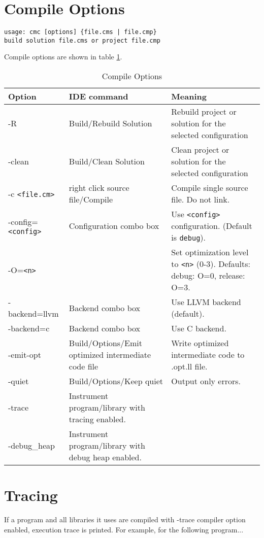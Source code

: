\documentclass[oneside, a4paper, 11pt]{article}
\begin{document}
\section{Compile Options}

\begin{verbatim}
usage: cmc [options] {file.cms | file.cmp}
build solution file.cms or project file.cmp
\end{verbatim}

Compile options are shown in table \ref{tab:options}.

\begin{table}[htb]
\caption{Compile Options}\label{tab:options}
\begin{tabular}{lp{5cm}p{5cm}}
\textbf{Option}& \textbf{IDE command}& \textbf{Meaning}\\
\hline
-R & Build/Rebuild Solution & Rebuild project or solution for the selected configuration\\
-clean & Build/Clean Solution & Clean project or solution for the selected configuration\\
-c \verb|<file.cm>| & right click source file/Compile & Compile single source file. Do not link.\\
-config=\verb|<config>| & Configuration combo box & Use \verb|<config>| configuration. (Default is \verb|debug|).\\
-O=\verb|<n>| & & Set optimization level to \verb|<n>| (0-3). Defaults: debug: O=0, release: O=3.\\
-backend=llvm & Backend combo box & Use LLVM backend (default).\\
-backend=c & Backend combo box & Use C backend.\\
-emit-opt & Build/Options/Emit optimized intermediate code file & Write optimized intermediate code to .opt.ll file.\\
-quiet & Build/Options/Keep quiet & Output only errors.\\
-trace & Instrument program/library with tracing enabled.\\
-debug\_heap & Instrument program/library with debug heap enabled.\\
\end{tabular}
\end{table}

\section{Tracing}

If a program and all libraries it uses are compiled with -trace compiler option enabled,
execution trace is printed. For example, for the following program...
\end{document}
